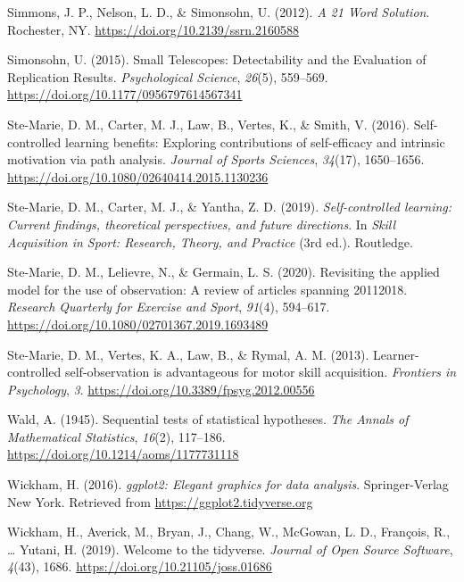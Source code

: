 \documentclass[
  english,
  man, donotrepeattitle,floatsintext]{apa7}
\newlength{\cslhangindent}
\newlength{\cslentryspacingunit} %
\newenvironment{CSLReferences}[2] %
 {%
  \setlength{\parindent}{0pt}
  \ifodd #1
  \let\oldpar\par
  \def\par{\hangindent=\cslhangindent\oldpar}
  \fi
  \setlength{\parskip}{#2\cslentryspacingunit}
 }%
 {}
\begin{document}
\begin{CSLReferences}{1}{0}
\leavevmode{}%
Simmons, J. P., Nelson, L. D., \& Simonsohn, U. (2012). \emph{A 21 Word Solution}. Rochester, NY. \url{https://doi.org/10.2139/ssrn.2160588}

\leavevmode{}%
Simonsohn, U. (2015). Small Telescopes: Detectability and the Evaluation of Replication Results. \emph{Psychological Science}, \emph{26}(5), 559--569. \url{https://doi.org/10.1177/0956797614567341}

\leavevmode{}%
Ste-Marie, D. M., Carter, M. J., Law, B., Vertes, K., \& Smith, V. (2016). Self-controlled learning benefits: Exploring contributions of self-efficacy and intrinsic motivation via path analysis. \emph{Journal of Sports Sciences}, \emph{34}(17), 1650--1656. \url{https://doi.org/10.1080/02640414.2015.1130236}

\leavevmode{}%
Ste-Marie, D. M., Carter, M. J., \& Yantha, Z. D. (2019). \emph{Self-controlled learning: Current findings, theoretical perspectives, and future directions}. In \emph{Skill Acquisition in Sport: Research, Theory, and Practice} (3rd ed.). Routledge.

\leavevmode{}%
Ste-Marie, D. M., Lelievre, N., \& Germain, L. S. (2020). Revisiting the applied model for the use of observation: A review of articles spanning 2011{\textendash}2018. \emph{Research Quarterly for Exercise and Sport}, \emph{91}(4), 594--617. \url{https://doi.org/10.1080/02701367.2019.1693489}

\leavevmode{}%
Ste-Marie, D. M., Vertes, K. A., Law, B., \& Rymal, A. M. (2013). Learner-controlled self-observation is advantageous for motor skill acquisition. \emph{Frontiers in Psychology}, \emph{3}. \url{https://doi.org/10.3389/fpsyg.2012.00556}

\leavevmode{}%
Wald, A. (1945). Sequential tests of statistical hypotheses. \emph{The Annals of Mathematical Statistics}, \emph{16}(2), 117--186. \url{https://doi.org/10.1214/aoms/1177731118}

\leavevmode{}%
Wickham, H. (2016). \emph{ggplot2: Elegant graphics for data analysis}. Springer-Verlag New York. Retrieved from \url{https://ggplot2.tidyverse.org}

\leavevmode{}%
Wickham, H., Averick, M., Bryan, J., Chang, W., McGowan, L. D., François, R., \ldots{} Yutani, H. (2019). Welcome to the {tidyverse}. \emph{Journal of Open Source Software}, \emph{4}(43), 1686. \url{https://doi.org/10.21105/joss.01686}


\end{CSLReferences}
\end{document}
